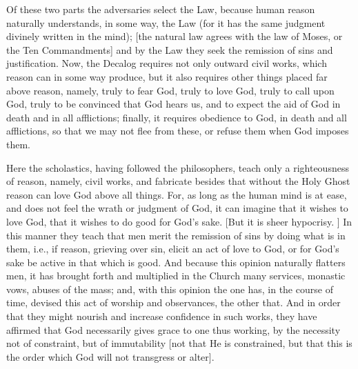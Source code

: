 Of these two parts the adversaries select the Law, because human
reason naturally understands, in some way, the Law (for it has the
same judgment divinely written in the mind); [the natural law agrees
with the law of Moses, or the Ten Commandments] and by the Law they
seek the remission of sins and justification.  Now, the Decalog
requires not only outward civil works, which reason can in some way
produce, but it also requires other things placed far above reason,
namely, truly to fear God, truly to love God, truly to call upon God,
truly to be convinced that God hears us, and to expect the aid of God
in death and in all afflictions; finally, it requires obedience to
God, in death and all afflictions, so that we may not flee from these,
or refuse them when God imposes them.

Here the scholastics, having followed the philosophers, teach only a
righteousness of reason, namely, civil works, and fabricate besides
that without the Holy Ghost reason can love God above all things.
For, as long as the human mind is at ease, and does not feel the
wrath or judgment of God, it can imagine that it wishes to love God,
that it wishes to do good for God's sake.  [But it is sheer hypocrisy.
] In this manner they teach that men merit the remission of sins by
doing what is in them, i.e., if reason, grieving over sin, elicit an
act of love to God, or for God's sake be active in that which is good.
And because this opinion naturally flatters men, it has brought
forth and multiplied in the Church many services, monastic vows,
abuses of the mass; and, with this opinion the one has, in the course
of time, devised this act of worship and observances, the other that.
And in order that they might nourish and increase confidence in such
works, they have affirmed that God necessarily gives grace to one
thus working, by the necessity not of constraint, but of immutability
[not that He is constrained, but that this is the order which God
will not transgress or alter].

